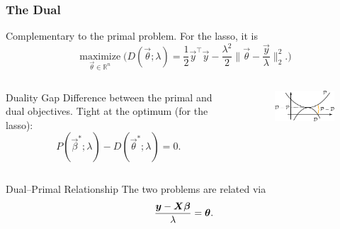 \documentclass[10pt]{beamer}
\begin{document}
\begin{frame}
  \frametitle{The Dual}
  Complementary to the primal problem. For the lasso, it is
  \[
    \operatorname*{maximize}_{\vec{\theta} \in \mathbb{R}^n}
    \Bigg(
    D(\vec{\theta}; \lambda) = \frac 1 2 \vec{y}^\intercal \vec{y} -
    \frac{\lambda^2}{2} \Big\lVert \vec{\theta} - \frac{\vec{y}}{\lambda} \Big\rVert_2^2.
    \Bigg)
  \]
  \pause
  \begin{columns}
    \begin{column}{0.45\linewidth}
      \begin{block}{Duality Gap}
        Difference between the primal and dual
        objectives. Tight at the optimum (for the lasso):
        \[
          P(\vec{\beta}^*; \lambda) - D(\vec{\theta}^*; \lambda) = 0.
        \]
      \end{block}
    \end{column}
    \begin{column}{0.45\linewidth}
      \begin{figure}[htpb]
        \centering
        \includegraphics[]{figures/paper2-duality-gap.pdf}
      \end{figure}
    \end{column}
  \end{columns}
  \medskip

  \pause

  \begin{block}{Dual--Primal Relationship}
    The two problems are related via
    \[
      \frac{\bm{y} - \bm{X}\bm{\beta}}{\lambda} = \bm{\theta}.
    \]
  \end{block}
\end{frame}
\end{document}
